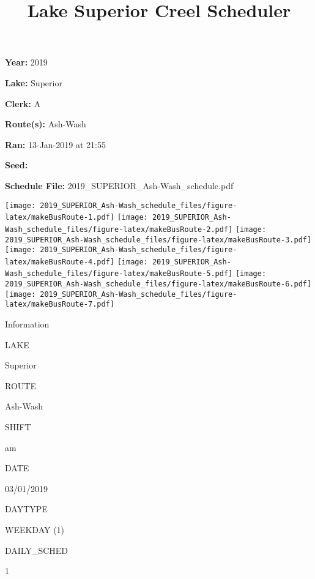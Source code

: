 \documentclass[]{article}
\title{Lake Superior Creel Scheduler}
\author{}
\date{}
\begin{document}
\maketitle

\fontsize{14}{18} \selectfont
{}

\textbf{Year:} 2019

\vspace{12pt}

\textbf{Lake:} Superior

\textbf{Clerk:} A

\textbf{Route(s):} Ash-Wash

\vspace{12pt}

\textbf{Ran:} 13-Jan-2019 at 21:55

\textbf{Seed:}

\textbf{Schedule File:} 2019\_SUPERIOR\_Ash-Wash\_schedule.pdf

\newpage

\texttt{[image: 2019\_SUPERIOR\_Ash-Wash\_schedule\_files/figure-latex/makeBusRoute-1.pdf]}
\texttt{[image: 2019\_SUPERIOR\_Ash-Wash\_schedule\_files/figure-latex/makeBusRoute-2.pdf]}
\texttt{[image: 2019\_SUPERIOR\_Ash-Wash\_schedule\_files/figure-latex/makeBusRoute-3.pdf]}
\texttt{[image: 2019\_SUPERIOR\_Ash-Wash\_schedule\_files/figure-latex/makeBusRoute-4.pdf]}
\texttt{[image: 2019\_SUPERIOR\_Ash-Wash\_schedule\_files/figure-latex/makeBusRoute-5.pdf]}
\texttt{[image: 2019\_SUPERIOR\_Ash-Wash\_schedule\_files/figure-latex/makeBusRoute-6.pdf]}
\texttt{[image: 2019\_SUPERIOR\_Ash-Wash\_schedule\_files/figure-latex/makeBusRoute-7.pdf]}
\newpage

Information

LAKE

Superior

ROUTE

Ash-Wash

SHIFT

am

DATE

03/01/2019

DAYTYPE

WEEKDAY (1)

DAILY\_SCHED

1

\vspace{24pt}
\end{document}
